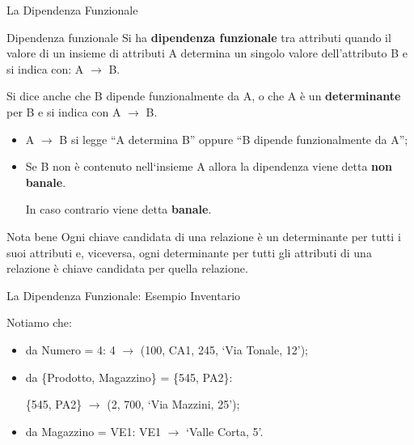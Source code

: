 \begin{frame}{La Dipendenza Funzionale}
\begin{minipage}{0.9\textwidth}
\begin{block}{Dipendenza funzionale}
    Si ha \textbf{dipendenza funzionale} tra attributi quando il valore di un insieme di attributi A determina un singolo valore dell'attributo B e si indica con: A $ \rightarrow $ B.

    Si dice anche che B dipende funzionalmente da A, o che A \`e un \textbf{determinante} per B e si indica con A $ \rightarrow $ B.
\end{block}
\end{minipage}
\pause
\begin{itemize}[<+->]
    \item A $ \rightarrow $ B si legge ``A determina B'' oppure ``B dipende funzionalmente da A'';
    \item Se B non \`e contenuto nell`insieme A allora la dipendenza viene detta \textbf{non banale}.
    
    In caso contrario viene detta \textbf{banale}.
\end{itemize}
\pause
\begin{block}{Nota bene}
    Ogni chiave candidata di una relazione \`e un determinante per tutti i suoi attributi e, viceversa, ogni determinante per tutti gli attributi di una relazione \`e chiave candidata per quella relazione.
\end{block}
\end{frame}
%
\begin{frame}{La Dipendenza Funzionale: Esempio Inventario}
\vspace{-0.7cm}
\InventarioModified

Notiamo che:
\begin{itemize}[<+->]
    \item da Numero = 4: 4 $ \rightarrow $ (100, CA1, 245, `Via Tonale, 12');
    \item da \{Prodotto, Magazzino\} = \{545, PA2\}:
    
    \{545, PA2\} $ \rightarrow $ (2, 700, `Via Mazzini, 25');
    \item da Magazzino = VE1: VE1 $ \rightarrow $ `Valle Corta, 5'.
\end{itemize}
\end{frame}
